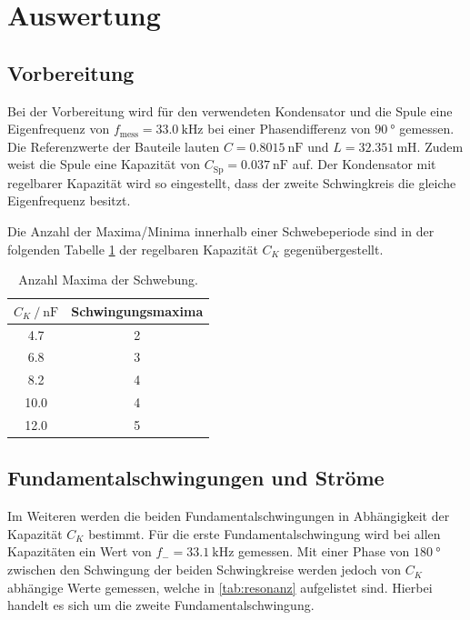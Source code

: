 \section{Auswertung}
\label{sec:Auswertung}

\subsection{Vorbereitung}
Bei der Vorbereitung wird für den verwendeten Kondensator und die Spule eine Eigenfrequenz von 
$f_{\text{mess}}=\SI{33.0}{\kilo\hertz}$ bei einer Phasendifferenz von $\SI{90}{\degree}$ gemessen. 
Die Referenzwerte der Bauteile lauten $C=\SI{0.8015}{\nano\farad}$ und $L=\SI{32.351}{\milli\henry}$. 
Zudem weist die Spule eine Kapazität von $C_\text{Sp}=\SI{0.037}{\nano\farad}$ auf.
Der Kondensator mit regelbarer Kapazität wird so eingestellt, dass der zweite Schwingkreis die gleiche Eigenfrequenz besitzt.

Die Anzahl der Maxima/Minima innerhalb einer Schwebeperiode sind in der folgenden Tabelle \ref{tab:schwing_maxima} der regelbaren Kapazität $C_K$ gegenübergestellt.

\begin{table}
    \centering
    \caption{Anzahl Maxima der Schwebung.}
    \label{tab:schwing_maxima}
    \begin{tabular}{c c}
        \toprule
        {$C_K \:/\: \si{\nano\farad}$} & Schwingungsmaxima \\
        \midrule
        4.7  & 2 \\ 
        6.8  & 3 \\ 
        8.2  & 4 \\ 
        10.0 & 4 \\ 
        12.0 & 5 \\ 
        \bottomrule
    \end{tabular}
\end{table}

\subsection{Fundamentalschwingungen und Ströme}
Im Weiteren werden die beiden Fundamentalschwingungen in Abhängigkeit der Kapazität $C_K$ bestimmt.
Für die erste Fundamentalschwingung wird bei allen Kapazitäten ein Wert von $f_- = \SI{33.1}{\kilo\hertz}$ gemessen.
Mit einer Phase von $\SI{180}{\degree}$ zwischen den Schwingung der beiden Schwingkreise werden jedoch von $C_K$ abhängige Werte gemessen, welche in \ref{tab:resonanz} aufgelistet sind.
Hierbei handelt es sich um die zweite Fundamentalschwingung.

